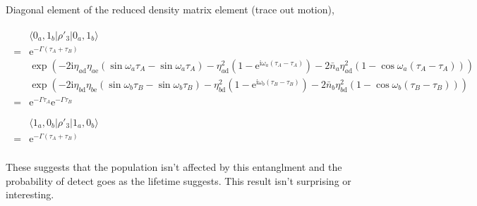 \documentclass[10pt,fleqn]{article}
\newcommand{\ue}{\mathrm{e}}
\newcommand{\ui}{\mathrm{i}}
\newcommand{\eqar}[1]
{
  \begin{align}
    #1
  \end{align}
}
\newcommand{\paren}[1]{{\left({#1}\right)}}
\begin{document}
Diagonal element of the reduced density matrix element (trace out motion),
\eqar{
  \begin{split}
    &\langle0_a,1_b|\rho'_3|0_a,1_b\rangle\\
    =&\ue^{-\Gamma\paren{\tau_A+\tau_B}}\\
    &\exp\paren{
      -2\ui\eta_{a\mathrm{d}}
      \eta_{a\mathrm{e}}\paren{\sin\omega_a\tau_{A}-\sin\omega_a\tau_{A}}
      -\eta_{a\mathrm{d}}^2\paren{1-\ue^{\ui\omega_a\paren{\tau_{A}-\tau_{A}}}}
      -2{\bar n_a}\eta_{a\mathrm{d}}^2\paren{1-\cos\omega_a\paren{\tau_{A}-\tau_{A}}}
      }\\
    &\exp\paren{
      -2\ui\eta_{b\mathrm{d}}
      \eta_{b\mathrm{e}}\paren{\sin\omega_b\tau_{B}-\sin\omega_b\tau_{B}}
      -\eta_{b\mathrm{d}}^2\paren{1-\ue^{\ui\omega_b\paren{\tau_{B}-\tau_{B}}}}
      -2{\bar n_b}\eta_{b\mathrm{d}}^2\paren{1-\cos\omega_b\paren{\tau_{B}-\tau_{B}}}
      }\\
    =&\ue^{-\Gamma\tau_A}\ue^{-\Gamma\tau_B}\\
  \end{split}\\
  \begin{split}
    &\langle1_a,0_b|\rho'_3|1_a,0_b\rangle\\
    =&\ue^{-\Gamma\paren{\tau_A+\tau_B}}\\
  \end{split}
}
These suggests that the population isn't affected by this entanglment
and the probability of detect goes as the lifetime suggests.
This result isn't surprising or interesting.\\
\end{document}
